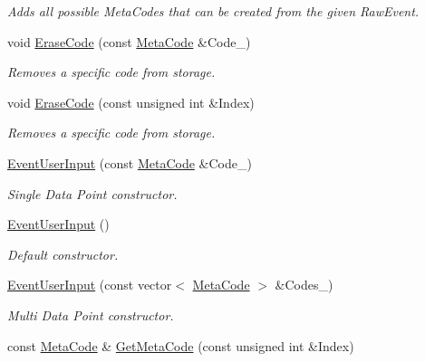 \begin{DoxyCompactItemize}
\begin{DoxyCompactList}\small\item\em Adds all possible MetaCodes that can be created from the given RawEvent. \item\end{DoxyCompactList}\item 
void \hyperlink{classMezzanine_1_1EventUserInput_aecca59338264fd49cf96661f28f02471}{EraseCode} (const \hyperlink{classMezzanine_1_1MetaCode}{MetaCode} \&Code\_\-)
\begin{DoxyCompactList}\small\item\em Removes a specific code from storage. \item\end{DoxyCompactList}\item 
void \hyperlink{classMezzanine_1_1EventUserInput_aede2a3b45edd2442eeac34814b9c03cc}{EraseCode} (const unsigned int \&Index)
\begin{DoxyCompactList}\small\item\em Removes a specific code from storage. \item\end{DoxyCompactList}\item 
\hyperlink{classMezzanine_1_1EventUserInput_ac54a20c16138388b64a86d8ed13854bb}{EventUserInput} (const \hyperlink{classMezzanine_1_1MetaCode}{MetaCode} \&Code\_\-)
\begin{DoxyCompactList}\small\item\em Single Data Point constructor. \item\end{DoxyCompactList}\item 
\hyperlink{classMezzanine_1_1EventUserInput_a3d5857827ca69112a5acfc715ff29814}{EventUserInput} ()
\begin{DoxyCompactList}\small\item\em Default constructor. \item\end{DoxyCompactList}\item 
\hyperlink{classMezzanine_1_1EventUserInput_aa29e31d1d166c54fd8b87a2dc50cebb6}{EventUserInput} (const vector$<$ \hyperlink{classMezzanine_1_1MetaCode}{MetaCode} $>$ \&Codes\_\-)
\begin{DoxyCompactList}\small\item\em Multi Data Point constructor. \item\end{DoxyCompactList}\item 
const \hyperlink{classMezzanine_1_1MetaCode}{MetaCode} \& \hyperlink{classMezzanine_1_1EventUserInput_aa6f011b62624507078cbbd32a382ba42}{GetMetaCode} (const unsigned int \&Index)

\end{DoxyCompactItemize}
